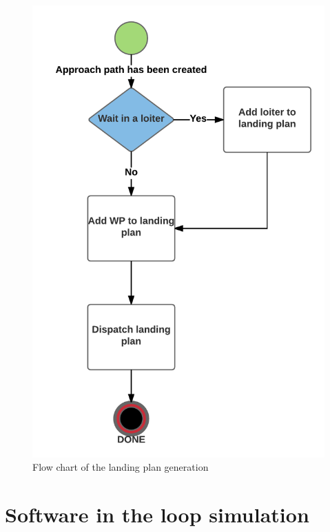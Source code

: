 \begin{figure}[H]
\centering
\includegraphics[scale=0.8]{figs/LandingPath.png}
\caption{Flow chart of the landing plan generation}
\label{Fig:FlowChartLanding}
\end{figure}
\section{Software in the loop simulation}\label{ss:SILLandingPlan}
